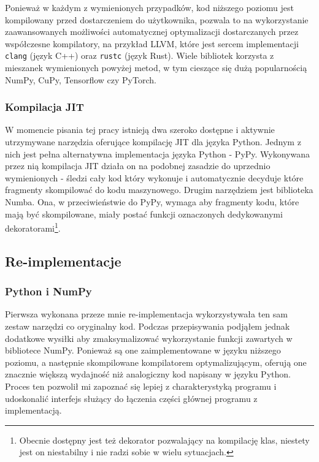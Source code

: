 \documentclass[10pt, a4paper]{article}
\newcommand{\code}[1]{\texttt{#1}}
\begin{document}
\begin{sloppypar}
    Ponieważ w każdym z wymienionych przypadków, kod niższego poziomu jest kompilowany
    przed dostarczeniem do użytkownika, pozwala to na wykorzystanie zaawansowanych możliwości
    automatycznej optymalizacji dostarczanych przez współczesne kompilatory, na przykład
    LLVM, które jest sercem implementacji \code{clang} (język C++) oraz \code{rustc} (język
    Rust). Wiele bibliotek korzysta z mieszanek wymienionych powyżej metod, w tym cieszące
    się dużą popularnością NumPy, CuPy, Tensorflow czy PyTorch.

    \subsubsection{Kompilacja JIT}


    W momencie pisania tej pracy istnieją dwa szeroko dostępne i aktywnie utrzymywane narzędzia
    oferujące kompilację JIT dla języka Python. Jednym z nich jest pełna alternatywna
    implementacja języka Python - PyPy\cite{PyPy_Home_Page}. Wykonywana przez nią
    kompilacja JIT działa on na podobnej zasadzie do uprzednio wymienionych - śledzi
    cały kod który wykonuje i automatycznie decyduje które fragmenty skompilować do kodu
    maszynowego\cite{PyPy_JIT}. Drugim narzędziem jest biblioteka Numba\cite{Numba_Article}\cite{Numba_Doc}.
    Ona, w przeciwieństwie do PyPy, wymaga aby fragmenty kodu, które mają być
    skompilowane, miały postać funkcji oznaczonych dedykowanymi dekoratorami\footnote{Obecnie
    dostępny jest też dekorator pozwalający na kompilację klas, niestety jest on niestabilny
    i nie radzi sobie w wielu sytuacjach.}.

    \subsection{Re-implementacje}


    \subsubsection{ Python i NumPy }


    Pierwsza wykonana przeze mnie re-implementacja wykorzystywała ten sam zestaw narzędzi
    co oryginalny kod. Podczas przepisywania podjąłem jednak dodatkowe wysiłki aby
    zmaksymalizować wykorzystanie funkcji zawartych w bibliotece NumPy. Ponieważ są one zaimplementowane
    w języku niższego poziomu, a następnie skompilowane kompilatorem optymalizującym, oferują
    one znacznie większą wydajność niż analogiczny kod napisany w języku Python. Proces
    ten pozwolił mi zapoznać się lepiej z charakterystyką programu i udoskonalić
    interfejs służący do łączenia części głównej programu z implementacją.


\end{sloppypar}
\end{document}
